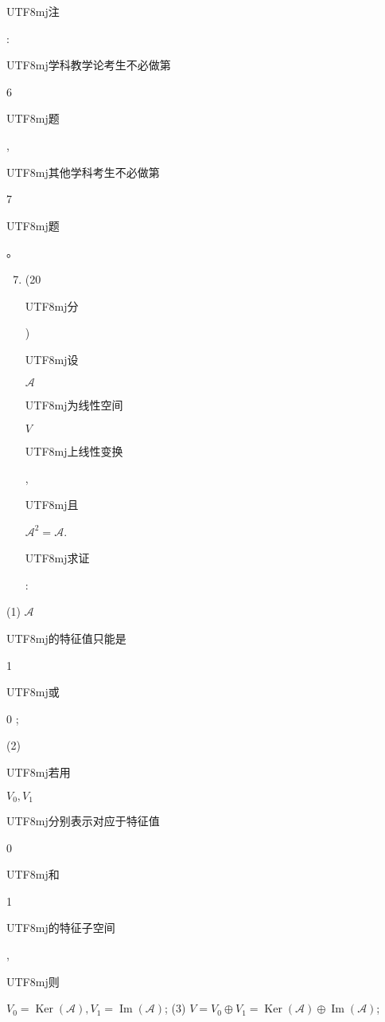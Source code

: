 \documentclass[10pt]{article}
\begin{document}
\begin{CJK}{UTF8}{mj}注\end{CJK}: \begin{CJK}{UTF8}{mj}学科教学论考生不必做第\end{CJK} 6 \begin{CJK}{UTF8}{mj}题\end{CJK}, \begin{CJK}{UTF8}{mj}其他学科考生不必做第\end{CJK} 7 \begin{CJK}{UTF8}{mj}题\end{CJK}。

\begin{enumerate}
  \setcounter{enumi}{6}
  \item (20 \begin{CJK}{UTF8}{mj}分\end{CJK}) \begin{CJK}{UTF8}{mj}设\end{CJK} $\mathscr{A}$ \begin{CJK}{UTF8}{mj}为线性空间\end{CJK} $V$ \begin{CJK}{UTF8}{mj}上线性变换\end{CJK}, \begin{CJK}{UTF8}{mj}且\end{CJK} $\mathscr{A}^{2}=\mathscr{A}$. \begin{CJK}{UTF8}{mj}求证\end{CJK}:
\end{enumerate}
(1) $\mathscr{A}$ \begin{CJK}{UTF8}{mj}的特征值只能是\end{CJK} 1 \begin{CJK}{UTF8}{mj}或\end{CJK} 0 ;

(2) \begin{CJK}{UTF8}{mj}若用\end{CJK} $V_{0}, V_{1}$ \begin{CJK}{UTF8}{mj}分别表示对应于特征值\end{CJK} 0 \begin{CJK}{UTF8}{mj}和\end{CJK} 1 \begin{CJK}{UTF8}{mj}的特征子空间\end{CJK}, \begin{CJK}{UTF8}{mj}则\end{CJK} $V_{0}=\operatorname{Ker}(\mathscr{A}), V_{1}=\operatorname{Im}(\mathscr{A})$; (3) $V=V_{0} \oplus V_{1}=\operatorname{Ker}(\mathscr{A}) \oplus \operatorname{Im}(\mathscr{A})$;
\end{document}
